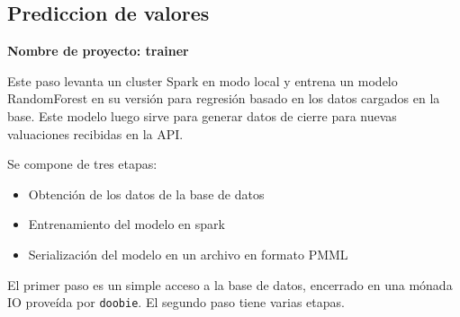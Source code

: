 \documentclass[10pt,spanish,a4paper,]{article}
\providecommand{\tightlist}{%
  \setlength{\itemsep}{0pt}\setlength{\parskip}{0pt}}
\begin{document}
\hypertarget{prediccion-de-valores}{%
\subsection{Prediccion de valores}\label{prediccion-de-valores}}

\textbf{Nombre de proyecto: trainer}

Este paso levanta un cluster Spark en modo local y entrena un modelo
RandomForest en su versión para regresión basado en los datos cargados
en la base. Este modelo luego sirve para generar datos de cierre para
nuevas valuaciones recibidas en la API.

Se compone de tres etapas:

\begin{itemize}
\tightlist
\item
  Obtención de los datos de la base de datos
\item
  Entrenamiento del modelo en spark
\item
  Serialización del modelo en un archivo en formato PMML
\end{itemize}

El primer paso es un simple acceso a la base de datos, encerrado en una
mónada IO proveída por \texttt{doobie}. El segundo paso tiene varias
etapas.
\end{document}
